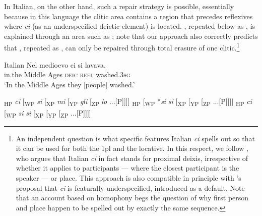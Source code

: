\documentclass[output=paper,modfonts,nonflat,newtxmath,colorlinks,citecolor=brown]{langsci/langscibook}
\begin{document}
In Italian, on the other hand, such a repair strategy is possible, essentially because in this language the clitic area contains a region that precedes reflexives where \textit{ci} (as an underspecified deictic element) is located. , repeated below as , is explained through an area such as ; note that our approach also correctly predicts that , repeated as , can only be repaired through total erasure of one clitic.\footnote{An independent question is what specific features Italian \textit{ci} spells out so that it can be used for both the 1pl and the locative. In this respect, we follow \citet{Ferrazzano2003}, who argues that Italian \textit{ci} in fact stands for proximal deixis, irrespective of whether it applies to participants — where the closest participant is the speaker — or place. This approach is also compatible in principle with \citeauthor{Pescarini2007}’s proposal that \textit{ci} is featurally underspecified, introduced as a default. Note that an account based on homophony begs the question of why first person and place happen to be spelled out by exactly the same sequence.}

\ea%
    \label{ex:cabre:26}
     Italian
    \ex  \label{ex:cabre:26b}
    \gll Nel medioevo  ci  si  lavava. \\
    in.the {Middle Ages}  \textsc{deic} \textsc{refl}  washed.\textsc{3sg}  \\
    \glt  ‘In the Middle Ages they [people] washed.’
    \z

%
\ex%
    \label{ex:cabre:27}
    \ea {[}\textsubscript{HP}  \textit{ci}   [\textsubscript{WP}   \textit{si}  [\textsubscript{XP}  \textit{mi}  [\textsubscript{YP}  \textit{gli}  [\textsubscript{ZP} \textit{lo}  ...[{\liv}P]{]]]}
    \ex {[}\textsubscript{HP}     [\textsubscript{WP} *\textit{si} \textit{si}  [\textsubscript{XP}    [\textsubscript{YP}    [\textsubscript{ZP}   ...[{\liv}P]{]]]}
    \ex  {[}\textsubscript{HP}  \textit{ci}  [\textsubscript{WP}   \textit{si} \textit{si}  [\textsubscript{XP}     [\textsubscript{YP}    [\textsubscript{ZP}   ...[{\liv}P]{]]]}
    \z
    \z

\z
\end{document}

